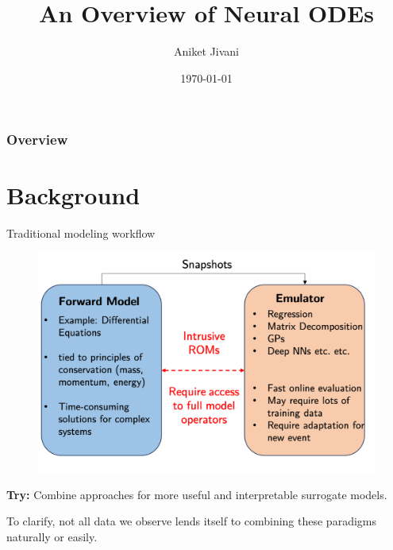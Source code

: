 \documentclass[usenames,dvipsnames]{beamer}
\title[Group Meeting]{An Overview of Neural ODEs}
\author[Aniket Jivani]{Aniket Jivani}
\date{\today}
\theoremstyle{definition}
\begin{document}
\begin{frame}
\titlepage %
\end{frame}



\begin{frame}
 \frametitle{Overview} %
 \tableofcontents %
\end{frame}

\section{Background}

\begin{frame}{Traditional modeling workflow}

    \begin{figure}
        \centering
        \includegraphics[width=0.7\linewidth]{ModellingDichotomy.png}
        \label{fig:fm_emulators}
    \end{figure}

    \textbf{Try: } Combine approaches for more useful and interpretable surrogate models.

    To clarify, not all data we observe lends itself to combining these paradigms naturally or easily.


\end{frame}
\end{document}
